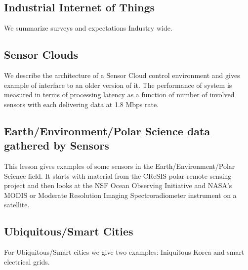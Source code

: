 

\subsection{Industrial Internet of
Things}\label{industrial-internet-of-things}

We summarize surveys and expectations Industry wide.



\subsection{Sensor Clouds}\label{sensor-clouds}

We describe the architecture of a Sensor Cloud control environment and
gives example of interface to an older version of it. The performance of
system is measured in terms of processing latency as a function of
number of involved sensors with each delivering data at 1.8 Mbps rate.



\subsection{Earth/Environment/Polar Science data gathered by
Sensors}\label{earthenvironmentpolar-science-data-gathered-by-sensors}

This lesson gives examples of some sensors in the
Earth/Environment/Polar Science field. It starts with material from the
CReSIS polar remote sensing project and then looks at the NSF Ocean
Observing Initiative and NASA's MODIS or Moderate Resolution Imaging
Spectroradiometer instrument on a satellite.



\subsection{Ubiquitous/Smart Cities}\label{ubiquitoussmart-cities}

For Ubiquitous/Smart cities we give two examples: Iniquitous Korea and
smart electrical grids.



